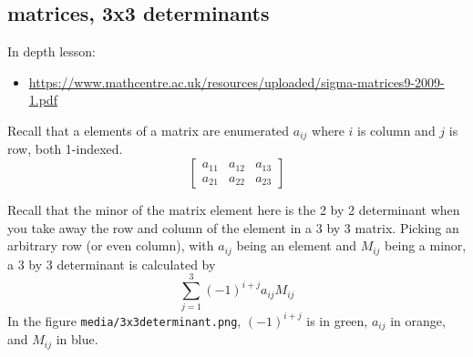 \documentclass[11pt]{article}
\theoremstyle{definition}
\begin{document}
\subsection*{matrices, 3x3 determinants}
In depth lesson:
\begin{itemize}
  \item \url{https://www.mathcentre.ac.uk/resources/uploaded/sigma-matrices9-2009-1.pdf}
\end{itemize}

Recall that a elements of a matrix are enumerated $a_{ij}$ where $i$ is column and $j$ is row, both 1-indexed. 
\[\begin{bmatrix}
  a_{11} & a_{12} & a_{13}\\
  a_{21} & a_{22} & a_{23}
\end{bmatrix}\]

Recall that the minor of the matrix element here is the 2 by 2 determinant when you take away the row and column of the element in a 3 by 3 matrix.  Picking an arbitrary row (or even column), with $a_{ij}$ being an element and $M_{ij}$ being a minor, a 3 by 3 determinant is calculated by 
\[ \sum_{j=1}^{3} (-1)^{i+j} a_{ij} M_{ij} \]
In the figure \texttt{media/3x3determinant.png}, $(-1)^{i+j}$ is in green, $a_{ij}$ in orange, and $M_{ij}$ in blue.






\end{document}
